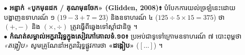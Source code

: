 \documentclass[a4paper,10pt]{article}
\newcommand{\en}[1]{{\TimesEn #1}}
\begin{document}
\begin{tcolorbox}[
  enhanced, sharp corners, colback=panelgray, colframe=black,
  boxrule=0.85pt, boxsep=2.5pt, top=4.5pt, bottom=4.5pt, left=6pt, right=6pt
]
  \fontsize{8.7pt}{12.9pt}\selectfont
  $\bullet$ \textbf{អន្ទាក់ «បូកមុនដក / គុណមុនចែក» (\en{Glidden, 2008})៖} បំបែកការយល់ច្រឡំនេះដោយបង្ហាញឧទាហរណ៍ ១ ($19-3+7=23$) និងឧទាហរណ៍ ៤ ($125\div 5\times 15 = 375$) ថា $(+,-)$ និង $(\times,\div)$ ត្រូវធ្វើពីឆ្វេងទៅស្ដាំជានិច្ច ។\\[2pt]
  $\bullet$ \textbf{កំណត់សម្គាល់អក្ខរាវិរុទ្ធក្នុងសៀវភៅគោលទំ.១០៖} ប្រអប់ជាទូទៅក្រោមឧទាហរណ៍ ៧ បោះពុម្ពថា \emph{«តង្កៀប»} សូមគ្រូណែនាំអក្ខរាវិរុទ្ធផ្លូវការថា \textbf{«ដង្កៀប»} ($[\dots]$) ។
\end{tcolorbox}
\end{document}
